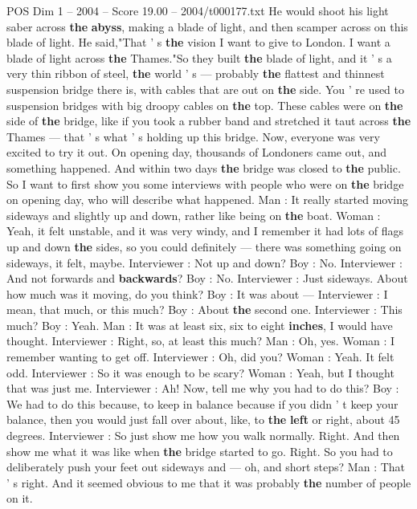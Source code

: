 \begin{textsample}{POS Dim 1 – 2004 – Score 19.00 – 2004/t000177.txt}
He would shoot his light saber across \textbf{the} \textbf{abyss}, making a blade of light, and then scamper across on this blade of light.
He said,"That ' s \textbf{the} vision I want to give to London.
I want a blade of light across \textbf{the} Thames."So they built \textbf{the} blade of light, and it ' s a very thin ribbon of steel, \textbf{the} world ' s — probably \textbf{the} flattest and thinnest suspension bridge there is, with cables that are out on \textbf{the} side.
You ' re used to suspension bridges with big droopy cables on \textbf{the} top.
These cables were on \textbf{the} side of \textbf{the} bridge, like if you took a rubber band and stretched it taut across \textbf{the} Thames — that ' s what ' s holding up this bridge.
Now, everyone was very excited to try it out.
On opening day, thousands of Londoners came out, and something happened.
And within two days \textbf{the} bridge was closed to \textbf{the} public.
So I want to first show you some interviews with people who were on \textbf{the} bridge on opening day, who will describe what happened.
Man : It really started moving sideways and slightly up and down, rather like being on \textbf{the} boat.
Woman : Yeah, it felt unstable, and it was very windy, and I remember it had lots of flags up and down \textbf{the} sides, so you could definitely — there was something going on sideways, it felt, maybe.
Interviewer : Not up and down?
Boy : No.
Interviewer : And not forwards and \textbf{backwards}?
Boy : No.
Interviewer : Just sideways.
About how much was it moving, do you think?
Boy : It was about — Interviewer : I mean, that much, or this much?
Boy : About \textbf{the} second one.
Interviewer : This much?
Boy : Yeah.
Man : It was at least six, six to eight \textbf{inches}, I would have thought.
Interviewer : Right, so, at least this much?
Man : Oh, yes.
Woman : I remember wanting to get off.
Interviewer : Oh, did you?
Woman : Yeah.
It felt odd.
Interviewer : So it was enough to be scary?
Woman : Yeah, but I thought that was just me.
Interviewer : Ah!
Now, tell me why you had to do this?
Boy : We had to do this because, to keep in balance because if you didn ' t keep your balance, then you would just fall over about, like, to \textbf{the} \textbf{left} or right, about 45 degrees.
Interviewer : So just show me how you walk normally.
Right.
And then show me what it was like when \textbf{the} bridge started to go.
Right.
So you had to deliberately push your feet out sideways and — oh, and short steps?
Man : That ' s right.
And it seemed obvious to me that it was probably \textbf{the} number of people on it.

\end{textsample}
